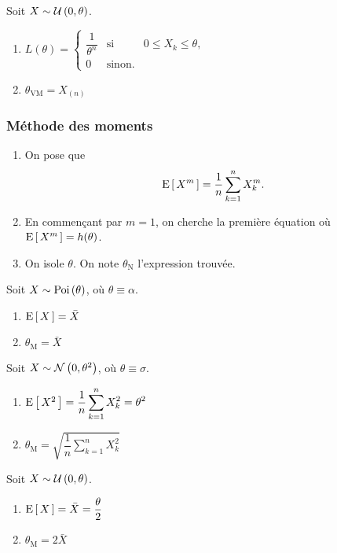 \documentclass[11pt]{article}
\newcommand\Poi[1]{%
	\ensuremath{%
		\mathrm{Poi}\left(#1\right)%
	}%
}%
\newcommand\Uni[2]{%
	\ensuremath{%
		\mathcal{U}\left(#1,#2\right)%
	}%
}%
\newcommand\Norm[2]{%
	\ensuremath{%
		\mathcal{N}\left(#1,#2\right)%
	}%
}%
\newcommand\Esp[1]{%
	\ensuremath{%
		\mathrm{E}\left[\,#1\,\right]%
	}%
}%
\theoremstyle{remark}
\theoremstyle{definition}
\begin{document}
\begin{exemple}
	Soit $X\sim\Uni{0}{\theta}$.

	\begin{enumerate}
		\item $
			L(\theta)
			=\left\{
				\begin{matrix}
					\dfrac{1}{\theta^n} & \text{si} & 0\leq X_k\leq\theta,\\
					0                   & \text{sinon}.
				\end{matrix}
			\right.
		$

		\item $
			\theta_{\text{VM}}=X_{(n)}
		$
	\end{enumerate}
\end{exemple}

\subsubsection{Méthode des moments}
\begin{enumerate}
	\item On pose que
	\begin{equation*}
		\Esp{X^m}=\frac{1}{n}\sum_{k=1}^nX_k^m.
	\end{equation*}

	\item En commençant par $m=1$, on cherche la première équation où
	$\Esp{X^m}=h(\theta)$.

	\item On isole $\theta$. On note $\theta_{\text{N}}$ l'expression trouvée.
\end{enumerate}

\begin{exemple}
	Soit $X\sim\Poi{\theta}$, où $\theta\equiv\alpha$.

	\begin{enumerate}
		\item $
			\Esp{X}=\bar{X}
		$

		\item $
			\theta_{\text{M}}=\bar{X}
		$
	\end{enumerate}
\end{exemple}

\begin{exemple}
	Soit $X\sim\Norm{0}{\theta^2}$, où $\theta\equiv\sigma$.

	\begin{enumerate}
		\item $
			\Esp{X^2}
			=\dfrac{1}{n}\displaystyle\sum_{k=1}^nX_k^2
			=\theta^2
		$

		\item $
			\theta_{\text{M}}
			=\sqrt{\dfrac{1}{n}\displaystyle\sum_{k=1}^nX_k^2}
		$
	\end{enumerate}
\end{exemple}

\begin{exemple}
	Soit $X\sim\Uni{0}{\theta}$.

	\begin{enumerate}
		\item $
			\Esp{X}
			=\bar{X}
			=\dfrac{\theta}{2}
		$

		\item $
			\theta_{\text{M}}
			=2\bar{X}
		$
	\end{enumerate}
\end{exemple}
\end{document}
